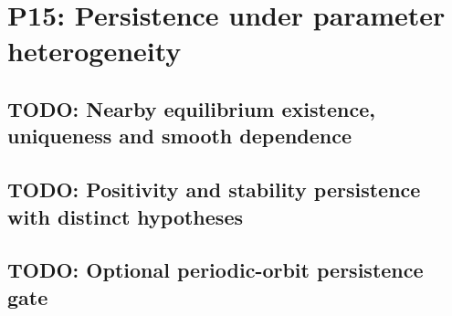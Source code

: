 
\section{P15: Persistence under parameter heterogeneity}
\label{sec:P15}

\subsection{TODO: Nearby equilibrium existence, uniqueness and smooth dependence}
\label{slot:P15-1}

\subsection{TODO: Positivity and stability persistence with distinct hypotheses}
\label{slot:P15-2}

\subsection{TODO: Optional periodic-orbit persistence gate}
\label{slot:P15-3}
